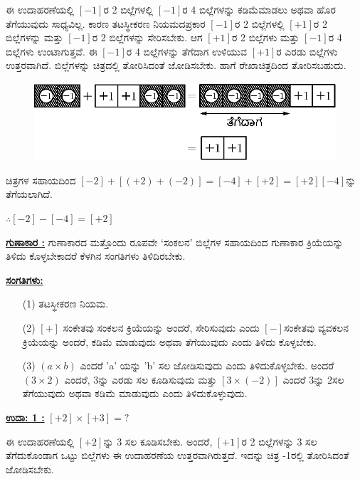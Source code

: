 ಈ ಉದಾಹರಣೆಯಲ್ಲಿ $[-1]$ರ 2 ಬಿಲ್ಲೆಗಳಲ್ಲಿ $[-1]$ರ 4 ಬಿಲ್ಲೆಗಳನ್ನು ಕಡಿಮೆ\break ಮಾಡಲು ಅಥವಾ ಹೊರ ತೆಗೆಯುವುದು ಸಾಧ್ಯವಿಲ್ಲ. ಕಾರಣ ತಟಸ್ಥೀಕರಣ ನಿಯಮದ\break  ಪ್ರಕಾರ $[-1]$ರ 2 ಬಿಲ್ಲೆಗಳಲ್ಲಿ $[+1]$ರ 2 ಬಿಲ್ಲೆಗಳನ್ನು ಮತ್ತು $[-1]$ರ 2 ಬಿಲ್ಲೆಗಳನ್ನು ಸೇರಿಸ\break ಬೇಕು. ಆಗ $[+1]$ರ 2 ಬಿಲ್ಲೆಗಳು ಮತ್ತು $[-1]$ರ 4 ಬಿಲ್ಲೆಗಳು ಉಂಟಾಗುತ್ತವೆ. ಈ $[-1]$ರ 4 ಬಿಲ್ಲೆಗಳನ್ನು ತೆಗೆದಾಗ ಉಳಿಯುವ $[+1]$ರ ಎರಡು ಬಿಲ್ಲೆಗಳು ಉತ್ತರವಾಗಿದೆ. ಬಿಲ್ಲೆಗಳನ್ನು ಚಿತ್ರದಲ್ಲಿ ತೋರಿಸಿದಂತೆ ಜೋಡಿಸಬೇಕು. ಹಾಗೆ ರೇಖಾಚಿತ್ರದಿಂದ ತೋರಿಸಬಹುದು. 
\begin{figure}[H]
\centering
\includegraphics[scale=0.8]{src/figure/chap3/fig3-17b.eps}
\end{figure}

ಚಿತ್ರಗಳ ಸಹಾಯದಿಂದ $[-2] + [(+2) + (-2)] = [-4] + [+2] = [+2]$\quad $[-4]$ನ್ನು ತೆಗೆಯಲಾಗಿದೆ.

$\therefore [-2] - [-4] = [+2]$

\noindent
\medskip
{\textbf{\underline{ಗುಣಾಕಾರ :}}} ಗುಣಾಕಾರದ ಮತ್ತೊಂದು ರೂಪವೇ `ಸಂಕಲನ' ಬಿಲ್ಲೆಗಳ ಸಹಾಯದಿಂದ ಗುಣಾಕಾರ ಕ್ರಿಯೆಯನ್ನು ತಿಳಿದು ಕೊಳ್ಳಬೇಕಾದರೆ ಕೆಳಗಿನ ಸಂಗತಿಗಳು ತಿಳಿದಿರಬೇಕು. 

\noindent
{\textbf{\underline{ಸಂಗತಿಗಳು:}}}
\begin{itemize}
\item [(1)] ತಟಸ್ಥೀಕರಣ ನಿಯಮ. 
\item [(2)] $[+]$ ಸಂಕೇತವು ಸಂಕಲನ ಕ್ರಿಯೆಯನ್ನು ಅಂದರೆ, ಸೇರಿಸುವುದು ಎಂದು $[-]$\break ಸಂಕೇತವು ವ್ಯವಕಲನ ಕ್ರಿಯೆಯನ್ನು ಅಂದರೆ, ಕಡಿಮೆ ಮಾಡುವುದು ಅಥವಾ ತೆಗೆಯುವುದು ಎಂದು ತಿಳಿದು ಕೊಳ್ಳಬೇಕು. 
\item[(3)] $(a \times b)$ ಎಂದರೆ 'a' ಯನ್ನು 'b' ಸಲ ಜೋಡಿಸುವುದು ಎಂದು ತಿಳಿದುಕೊಳ್ಳಬೇಕು. ಅಂದರೆ $(3 \times 2)$ ಎಂದರೆ, 3ನ್ನು ಎರಡು ಸಲ ಕೂಡಿಸುವುದು ಮತ್ತು $[3 \times (-2)]$ ಎಂದರೆ 3ನ್ನು 2ಸಲ ತೆಗೆಯುವುದು ಅಥವಾ ಕಡಿಮೆ ಮಾಡುವುದು ಎಂದು ತಿಳಿದುಕೊಳ್ಳುವುದು.
\end{itemize}

\noindent
{\textbf{\underline{ಉದಾ: 1 :}}} $[+2] \times [+3] = ?$

ಈ ಉದಾಹರಣೆಯಲ್ಲಿ $[+2]$ನ್ನು 3 ಸಲ ಕೂಡಿಸಬೇಕು. ಅಂದರೆ, $[+1]$ರ 2 ಬಿಲ್ಲೆಗಳನ್ನು 3 ಸಲ ತೆಗೆದುಕೊಂಡಾಗ ಒಟ್ಟು ಬಿಲ್ಲೆಗಳು ಈ ಉದಾಹರಣೆಯ ಉತ್ತರವಾಗಿರುತ್ತದೆ. ಇದನ್ನು ಚಿತ್ರ -1ರಲ್ಲಿ ತೋರಿಸಿದಂತೆ ಜೋಡಿಸಬೇಕು. 

